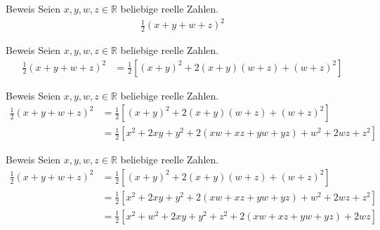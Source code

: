 \documentclass[10pt]{beamer}
\def\bR{\mathbb{R}}
\begin{document}
\begin{frame}{Beweis}
    Seien \( x, y, w, z \in \bR \) beliebige reelle Zahlen.
    \begin{align*}
        \frac{1}{2} \left( x + y + w + z \right)^{2}
    \end{align*}
\end{frame}



\begin{frame}{Beweis}
    Seien \( x, y, w, z \in \bR \) beliebige reelle Zahlen.
    \begin{align*}
        \frac{1}{2} \left( x + y + w + z \right)^{2}
        & = \frac{1}{2} \left[ \left( x + y \right)^{2} + 2 \left( x + y \right)\left( w + z \right) + \left( w + z \right)^{2} \right] 
    \end{align*}
\end{frame}



\begin{frame}{Beweis}
    Seien \( x, y, w, z \in \bR \) beliebige reelle Zahlen.
    \begin{align*}
        \frac{1}{2} \left( x + y + w + z \right)^{2}
        & = \frac{1}{2} \left[ \left( x + y \right)^{2} + 2 \left( x + y \right)\left( w + z \right) + \left( w + z \right)^{2} \right] \\
        & = \frac{1}{2} \left[ x^{2} + 2xy + y^{2} + 2 \left( xw + xz + yw + yz \right) + w^{2} + 2wz + z^{2} \right]
    \end{align*}
\end{frame}



\begin{frame}{Beweis}
    Seien \( x, y, w, z \in \bR \) beliebige reelle Zahlen.
    \begin{align*}
        \frac{1}{2} \left( x + y + w + z \right)^{2}
        & = \frac{1}{2} \left[ \left( x + y \right)^{2} + 2 \left( x + y \right)\left( w + z \right) + \left( w + z \right)^{2} \right] \\
        & = \frac{1}{2} \left[ x^{2} + 2xy + y^{2} + 2 \left( xw + xz + yw + yz \right) + w^{2} + 2wz + z^{2} \right] \\
        & = \frac{1}{2} \left[ x^{2} + w^{2} + 2xy + y^{2} + z^{2} + 2 \left( xw + xz + yw + yz \right)  + 2wz \right]
    \end{align*}
\end{frame}
\end{document}
